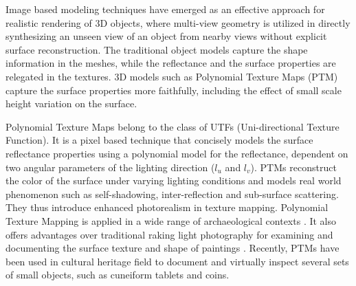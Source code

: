 
Image based modeling techniques \cite{C8,C6,C7} have emerged as
an effective approach for realistic rendering of 3D objects,
where multi-view geometry is utilized in directly synthesizing 
an unseen view of an object from nearby views without
explicit surface reconstruction. The traditional object models capture the shape information in the meshes,
while the reflectance and the surface properties are relegated in the textures. 3D models such as 
Polynomial Texture Maps (PTM) capture the 
surface properties more faithfully, including the effect of small scale height variation on the surface.

Polynomial Texture Maps \cite{C4} belong to the class of UTFs (Uni-directional Texture Function). It is a pixel
based technique that concisely models the surface reflectance properties using a
polynomial model for the reflectance, dependent on two angular parameters of the
lighting direction ($l_u$ and $l_v$). PTMs reconstruct the color of the surface under varying
lighting conditions and models real world phenomenon such as
self-shadowing, inter-reflection and sub-surface scattering. They thus introduce
enhanced photorealism in texture mapping.
Polynomial Texture Mapping is applied in a wide
range of archaeological contexts \cite{C14}. 
It also offers advantages over traditional raking
light photography for examining and
documenting the surface texture and
shape of paintings \cite{C13}.
Recently, PTMs have been used in cultural heritage field to document and virtually inspect 
several sets of small objects, such as cuneiform tablets and coins.





